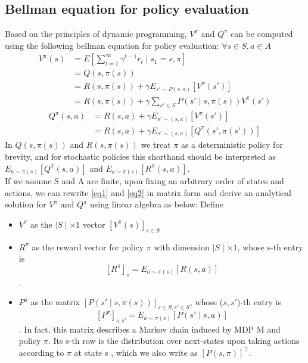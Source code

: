 \documentclass{report}
\begin{document}
\subsection{Bellman equation for policy evaluation}
Based on the principles of dynamic programming, $V^{\pi}$ and $Q^{\pi}$ can be computed using the following bellman equation for policy evaluation: $\forall s\in S, a \in A$
\begin{equation} \label{eq1}
\begin{split}
V^{\pi}(s) & = E[\sum_{t=1}^{\infty}\gamma^{t-1}r_t \mid s_1=s,\pi] \\
          & = Q(s, \pi(s)) \\ 
          & = R(s,\pi(s))+\gamma E_{s' \sim P(s,a)}[V^{\pi}(s')] \\
          & = R(s,\pi(s))+\gamma \sum_{s'\in S}P(s' \mid s,\pi(s))V^{\pi}(s') 
\end{split}
\end{equation}
\begin{equation} \label{eq2}
\begin{split}
    Q^{\pi}(s,a) & = R(s,a)+\gamma E_{s'\sim(s,a)}[V^{\pi}(s')] \\
                & =  R(s,a)+\gamma E_{s'\sim(s,a)}[Q^{\pi}(s', \pi(s'))]           
\end{split}
\end{equation}
In $Q(s, \pi(s))$ and $R(s,\pi(s))$ we treat $\pi$ as a deterministic policy for brevity, and for stochastic policies this shorthand should be interpreted as $E_{a\sim\pi(s)}[Q^{\pi}(s,a)]$ and $E_{a\sim\pi(s)}[R^{\pi}(s,a)]$.\\
If we assume S and A are finite, upon fixing an arbitrary order of states and actions, we can rewrite \ref{eq1} and \ref{eq2} in matrix form and derive an analytical solution for $V^{\pi}$ and $Q^{\pi}$ using linear algebra as below: Define
\begin{itemize}
    \item $V^{\pi}$ as the $\mid S\mid \times 1$ vector $[V^{\pi}(s)]_{s\in S}$
    \item $R^{\pi}$ as the reward vector for policy $\pi$ with dimension $\mid S \mid \times 1$, whose s-th entry is \[[R^{\pi}]_s=E_{a\sim\pi(s)}[R(s,a)]\].
    \item $P^{\pi}$ as the matrix $[P(s'\mid s,\pi(s))]_{s\in S,s'\in S}$, whose ($s,s'$)-th entry is \[[P^{\pi}]_{s,s'}=E_{a\sim\pi(s)}[P(s'\mid s,a)]\]. In fact, this matrix describes a Markov chain induced by MDP M and policy $\pi$. Its s-th row is the distribution over next-states upon taking actions according to $\pi$ at state s , which we also write as $[P(s,\pi)]^{\top}$.
\end{itemize}
\end{document}
